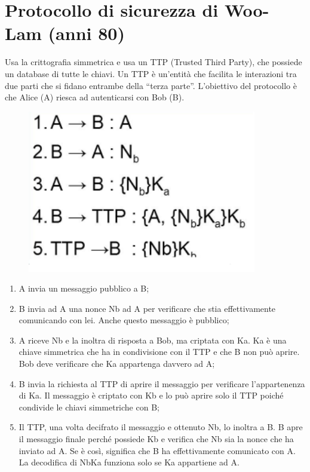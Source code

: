 \section{Protocollo di sicurezza di Woo-Lam (anni 80)}

Usa la crittografia simmetrica e usa un TTP (Trusted Third Party), che
possiede un database di
tutte le chiavi. Un TTP è un'entità che facilita le interazioni tra due
parti che si fidano entrambe
della “terza parte”.
L'obiettivo del protocollo è che Alice (A) riesca ad autenticarsi
con Bob (B).

\begin{figure}[H]
    \centering
    \includegraphics[width=10cm, keepaspectratio]{capitoli/crittografia/imgs/Mulan.png}
\end{figure}

\begin{enumerate}
    \item A invia un messaggio pubblico a B;
    \item B invia ad A una nonce Nb ad A per verificare che stia
          effettivamente comunicando con lei. Anche questo messaggio è
          pubblico;
    \item A riceve Nb e la inoltra di risposta a Bob, ma criptata con
          Ka. Ka è una chiave simmetrica che ha in condivisione con il
          TTP e che B non può aprire. Bob deve verificare che Ka
          appartenga davvero ad A;
    \item B invia la richiesta al TTP di aprire il messaggio per verificare
          l’appartenenza di Ka. Il
          messaggio è criptato con Kb e lo può aprire solo il TTP poiché condivide
          le chiavi
          simmetriche con B;
    \item Il TTP, una volta decifrato il messaggio e ottenuto Nb, lo inoltra a B.
          B apre il messaggio
          finale perché possiede Kb e verifica che Nb sia la nonce che ha inviato ad A.
          Se è così,
          significa che B ha effettivamente comunicato con A. La decodifica di {Nb}Ka
          funziona solo se Ka appartiene ad A.
\end{enumerate}

